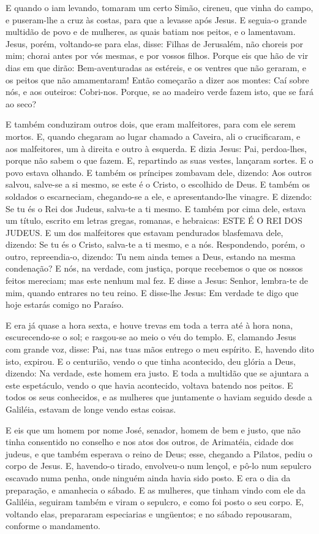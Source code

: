 E quando o iam levando, tomaram um certo Simão, cireneu, que
vinha do campo, e puseram-lhe a cruz às costas, para que a levasse
após Jesus. E seguia-o grande multidão de povo e de mulheres,
as quais batiam nos peitos, e o lamentavam. Jesus, porém,
voltando-se para elas, disse: Filhas de Jerusalém, não choreis por
mim; chorai antes por vós mesmas, e por vossos filhos. Porque
eis que hão de vir dias em que dirão: Bem-aventuradas as estéreis, e
os ventres que não geraram, e os peitos que não amamentaram!
Então começarão a dizer aos montes: Caí sobre nós, e aos
outeiros: Cobri-nos. Porque, se ao madeiro verde fazem isto,
que se fará ao seco?

E também conduziram outros dois, que eram malfeitores, para com
ele serem mortos. E, quando chegaram ao lugar chamado a
Caveira, ali o crucificaram, e aos malfeitores, um à direita e outro
à esquerda. E dizia Jesus: Pai, perdoa-lhes, porque não sabem
o que fazem. E, repartindo as suas vestes, lançaram sortes. E
o povo estava olhando. E também os príncipes zombavam dele, dizendo:
Aos outros salvou, salve-se a si mesmo, se este é o Cristo, o
escolhido de Deus. E também os soldados o escarneciam,
chegando-se a ele, e apresentando-lhe vinagre. E dizendo: Se
tu és o Rei dos Judeus, salva-te a ti mesmo. E também por
cima dele, estava um título, escrito em letras gregas, romanas, e
hebraicas: ESTE É O REI DOS JUDEUS. E um dos malfeitores que
estavam pendurados blasfemava dele, dizendo: Se tu és o Cristo,
salva-te a ti mesmo, e a nós. Respondendo, porém, o outro,
repreendia-o, dizendo: Tu nem ainda temes a Deus, estando na mesma
condenação? E nós, na verdade, com justiça, porque recebemos
o que os nossos feitos mereciam; mas este nenhum mal fez. E
disse a Jesus: Senhor, lembra-te de mim, quando entrares no teu
reino. E disse-lhe Jesus: Em verdade te digo que hoje estarás
comigo no Paraíso.

E era já quase a hora sexta, e houve trevas em toda a terra até à
hora nona, escurecendo-se o sol; e rasgou-se ao meio o véu do
templo. E, clamando Jesus com grande voz, disse: Pai, nas
tuas mãos entrego o meu espírito. E, havendo dito isto, expirou.
E o centurião, vendo o que tinha acontecido, deu glória a
Deus, dizendo: Na verdade, este homem era justo. E toda a
multidão que se ajuntara a este espetáculo, vendo o que havia
acontecido, voltava batendo nos peitos. E todos os seus
conhecidos, e as mulheres que juntamente o haviam seguido desde a
Galiléia, estavam de longe vendo estas coisas.

E eis que um homem por nome José, senador, homem de bem e justo,
que não tinha consentido no conselho e nos atos dos outros,
de Arimatéia, cidade dos judeus, e que também esperava o reino de
Deus; esse, chegando a Pilatos, pediu o corpo de Jesus.
E, havendo-o tirado, envolveu-o num lençol, e pô-lo num
sepulcro escavado numa penha, onde ninguém ainda havia sido posto.
E era o dia da preparação, e amanhecia o sábado. E as
mulheres, que tinham vindo com ele da Galiléia, seguiram também e
viram o sepulcro, e como foi posto o seu corpo. E, voltando
elas, prepararam especiarias e ungüentos; e no sábado repousaram,
conforme o mandamento.

